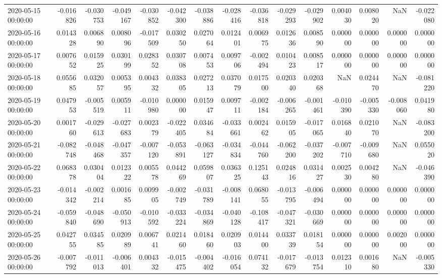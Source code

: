 \begin{tabular}{lrrrrrrrrrrrrrr}
2020-05-15 00:00:00 & -0.016826 & -0.030753 & -0.049167 & -0.030852 & -0.042300 & -0.038886 & -0.028416 & -0.036818 & -0.029293 & -0.029902 & 0.004030 & 0.008020 & NaN & -0.022080 \\
2020-05-16 00:00:00 & 0.014328 & 0.006890 & 0.008096 & -0.017509 & 0.030250 & 0.027064 & 0.012401 & 0.006975 & 0.012636 & 0.008590 & 0.000000 & 0.000000 & 0.000000 & 0.000000 \\
2020-05-17 00:00:00 & 0.007652 & 0.015925 & 0.030199 & 0.028352 & 0.030708 & 0.007453 & 0.009706 & -0.002494 & 0.010423 & 0.008517 & 0.000000 & 0.000000 & 0.000000 & 0.000000 \\
2020-05-18 00:00:00 & 0.055685 & 0.032057 & 0.005395 & 0.004332 & 0.038305 & 0.027213 & 0.037079 & 0.017500 & 0.020340 & 0.020368 & NaN & 0.024470 & NaN & -0.081220 \\
2020-05-19 00:00:00 & 0.047953 & -0.005519 & 0.005911 & -0.010980 & 0.000000 & 0.015947 & 0.009711 & -0.002184 & -0.006265 & -0.001461 & -0.010390 & -0.005330 & -0.008060 & 0.041980 \\
2020-05-20 00:00:00 & 0.001760 & -0.029613 & -0.027683 & 0.002379 & -0.022405 & 0.034684 & -0.033661 & 0.002462 & 0.015905 & -0.017065 & 0.016840 & 0.021070 & NaN & -0.083200 \\
2020-05-21 00:00:00 & -0.082748 & -0.048468 & -0.047357 & -0.007120 & -0.053891 & -0.063127 & -0.034834 & -0.044760 & -0.062200 & -0.037202 & -0.007710 & -0.009680 & NaN & 0.055020 \\
2020-05-22 00:00:00 & 0.068378 & 0.030404 & 0.012322 & 0.005578 & 0.044269 & 0.059807 & 0.036325 & 0.125143 & 0.024816 & 0.031427 & 0.002530 & 0.004280 & NaN & -0.046390 \\
2020-05-23 00:00:00 & -0.014342 & -0.002214 & 0.001685 & 0.009905 & -0.002749 & -0.031789 & -0.008141 & 0.068055 & -0.013795 & -0.006494 & 0.000000 & 0.000000 & 0.000000 & 0.000000 \\
2020-05-24 00:00:00 & -0.059840 & -0.048690 & -0.050913 & -0.010592 & -0.033224 & -0.034869 & -0.040128 & -0.108417 & -0.047321 & -0.030669 & 0.000000 & 0.000000 & 0.000000 & 0.000000 \\
2020-05-25 00:00:00 & 0.042755 & 0.034585 & 0.020989 & 0.006741 & 0.021460 & 0.018460 & 0.020903 & 0.014400 & 0.033739 & 0.018154 & 0.000000 & 0.000000 & 0.002000 & 0.000000 \\
2020-05-26 00:00:00 & -0.007792 & -0.011013 & -0.006401 & 0.004332 & -0.015475 & -0.004402 & -0.016054 & 0.074132 & -0.017679 & -0.013754 & 0.012310 & 0.001680 & NaN & -0.005330 \\

\end{tabular}
